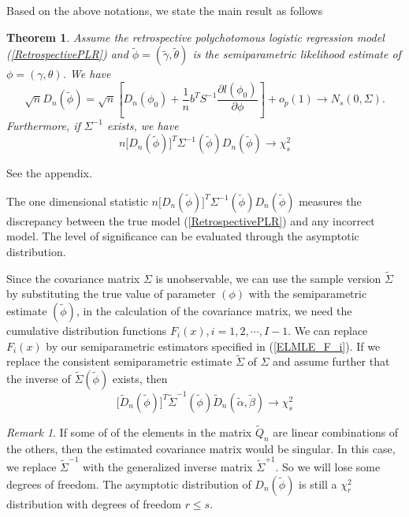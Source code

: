 \documentclass[11pt]{article}
\def\le{\leqslant}
\theoremstyle{plain}
\newtheorem{theorem}{Theorem}%
\theoremstyle{definition}
\theoremstyle{remark}
\newtheorem{rem}{Remark}[section]
\theoremstyle{definition}
\begin{document}
Based on the above notations, we state the main result as follows
\begin{theorem}
Assume the retrospective polychotomous logistic regression model (\ref{RetrospectivePLR}) and $\tilde{\phi}=(\tilde{\gamma}, \tilde{\theta})$ is the semiparametric likelihood estimate of $\phi=(\gamma, \theta)$. We have
\begin{equation}
\sqrt{n}D_n(\tilde{\phi})=\sqrt{n}\left[ D_n(\phi_0)
+\frac{1}{n}b^T S^{-1}\frac{\partial l(\phi_0)}{\partial \phi
}\right]+o_p(1)\rightarrow N_s(0,\Sigma).\label{Q_Normality}
\end{equation}
Furthermore, if $\Sigma^{-1}$ exists, we have
\begin{equation}
n\big[D_n(\tilde{\phi})\big]^T \Sigma^{-1}(\tilde{\phi})D_n(\tilde{\phi})\rightarrow
\chi_s^2
\end{equation}
\end{theorem}
 \hspace{3mm} See the appendix.

\noindent The one dimensional statistic $n\big[D_n(\tilde{\phi})\big]^T \Sigma^{-1}(\tilde{\phi})D_n(\tilde{\phi})$ measures the discrepancy between the true model (\ref{RetrospectivePLR}) and any incorrect model. The level of significance can be evaluated through the asymptotic distribution.

Since the covariance matrix $\Sigma$ is unobservable, we can use the sample version
$\tilde{\Sigma}$ by substituting the true value of parameter
$(\phi)$ with the semiparametric estimate $(\tilde{\phi})$, in the calculation of the
covariance matrix, we need the cumulative distribution functions
$F_i(x), i=1, 2, \cdots, I-1$. We can replace $F_i(x)$ by our
semiparametric estimators specified in (\ref{ELMLE_F_i}). If we
replace the consistent semiparametric estimate $\tilde{\Sigma}$ of
$\Sigma$ and assume further that the inverse of
$\tilde{\Sigma}(\tilde{\phi})$ exists, then
$$\big[\tilde{D}_n(\tilde{\phi})\big]^T \tilde{\Sigma}^{-1}(\tilde{\phi})\tilde{D}_n(\tilde{\alpha}, \tilde{\beta})\rightarrow
\chi_s^2$$

\begin{rem}
If some of of the elements in the matrix $ \tilde{Q}_n$ are linear
combinations of the others, then the estimated covariance matrix
would be singular. In this case, we replace $\tilde{\Sigma}^{-1}$
with the generalized inverse matrix $\tilde{\Sigma}^{+1}$. So we
will lose some degrees of freedom. The asymptotic distribution of
$D_n(\tilde{\phi})$ is still a $\chi_r^2$
distribution with degrees of freedom $r\le s$.
\end{rem}
\end{document}
